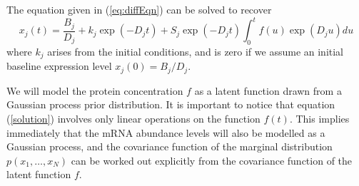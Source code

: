 \documentclass[english]{article}
\begin{document}
The equation given in (\ref{eq:diffEqn}) can be solved to recover\begin{equation}
x_{j}\left(t\right)=\frac{B_{j}}{D_{j}}+k_{j}\exp\left(-D_{j}t\right)+S_{j}
\exp\left(-D_{j}t\right)\int_{0}^{t}f\left(u\right)\exp\left(D_{j}u\right)du
\label{solution}\end{equation}
where $k_{j}$ arises from the initial conditions, 
and is zero if we assume an initial baseline expression level
$x_j(0)=B_{j}/D_{j}$.

We will model the protein concentration $f$ as a latent function drawn from 
a Gaussian process prior distribution. 
It is important to notice that equation (\ref{solution}) involves only linear
operations on the function $f\left(t\right)$. This implies immediately that the
mRNA abundance levels will also be modelled as a Gaussian process, and the 
covariance function of the marginal distribution $p\left(x_1,\ldots,x_N\right)$
can be worked out explicitly from the covariance function of the latent
function $f$.
\end{document}
